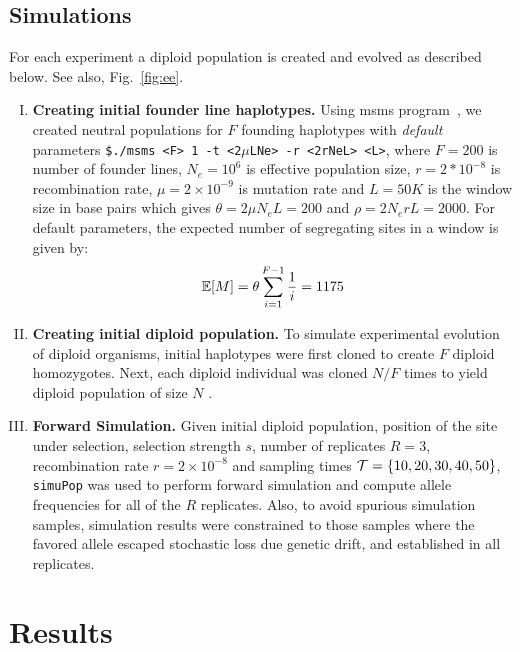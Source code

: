 \documentclass[11pt]{article}
\begin{document}
\subsection{Simulations}
For each experiment a diploid population is created and evolved as
described below. See also, Fig.~\ref{fig:ee}.
\begin{enumerate}[I.]
\item {\bf Creating initial founder line haplotypes.} Using msms
  program~\cite{XXX}, we created neutral populations for $F$ founding
  haplotypes with \emph{default} parameters \texttt{\$./msms <F> 1 -t
    <2$\mu$LNe> -r <2rNeL> <L>}, where $F=200$ is number of founder
  lines, $N_e=10^6$ is effective population size, $r=2*10^{-8}$ is
  recombination rate, $\mu=2\times 10^{-9}$ is mutation rate and
  $L=50K$ is the window size in base pairs which gives $\theta=2\mu
  N_eL=200$ and $\rho=2N_erL=2000$.   For
  default parameters, the expected number of segregating sites in a
  window is given by:
  \begin{equation}
    {\mathbb E}[M]=\theta \sum_{i=1}^{F-1}\frac{1}{i}=1175     
    \label{eq:watterson}
  \end{equation}
  
\item{\bf Creating initial diploid population.} To simulate
  experimental evolution of diploid organisms, initial haplotypes were
  first cloned to create $F$ diploid homozygotes. Next, each diploid
  individual was cloned $N/F$ times to yield diploid population of
  size $N$ .

\item{\bf Forward Simulation.} Given initial diploid population,
  position of the site under selection, selection strength $s$, number
  of replicates $R=3$, recombination rate $r=2\times10^{-8}$ and
  sampling times ${\cal T}=\{10,20,30,40,50\}$, \texttt{simuPop} was used
  to perform forward simulation and compute allele frequencies for all
  of the $R$ replicates. Also, to avoid spurious simulation samples,
  simulation results were constrained to those samples where the
  favored allele escaped stochastic loss due genetic drift, and
  established in all replicates.
\end{enumerate}



\section{Results}
\end{document}
